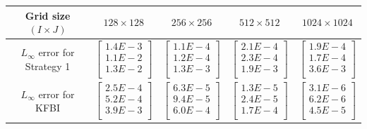 \documentclass{article}
\begin{document}
\begin{table}[ht]
    \centering
    \begin{tabular}{|c|c|c|c|c|} \hline 
         Grid size $(I \times J)$ & $128 \times 128$ & $256 \times 256$ &$512 \times 512$   &$1024 \times 1024$\\ \hline 
         $L_{\infty}$ error for Strategy 1 & $\begin{bmatrix} 1.4E-3 \\ 1.1E-2 \\ 1.3E-2 \\ \end{bmatrix}$ 
         & $\begin{bmatrix} 1.1E-4 \\ 1.2E-4 \\ 1.3E-3 \\ \end{bmatrix}$
         & $\begin{bmatrix} 2.1E-4 \\ 2.3E-4 \\ 1.9E-3 \\ \end{bmatrix}$
         & $\begin{bmatrix} 1.9E-4 \\ 1.7E-4 \\ 3.6E-3 \\ \end{bmatrix}$
         \\ \hline
         $L_{\infty}$ error for KFBI & $\begin{bmatrix} 2.5E-4 \\ 5.2E-4 \\ 3.9E-3 \\ \end{bmatrix}$ 
         & $\begin{bmatrix} 6.3E-5 \\ 9.4E-5 \\ 6.0E-4 \\ \end{bmatrix}$ 
         & $\begin{bmatrix} 1.3E-5 \\ 2.4E-5 \\ 1.7E-4 \\ \end{bmatrix}$
         & $\begin{bmatrix} 3.1E-6 \\ 6.2E-6 \\ 4.5E-5 \\ \end{bmatrix}$ \\ \hline

\end{tabular}
\end{table}
\end{document}
